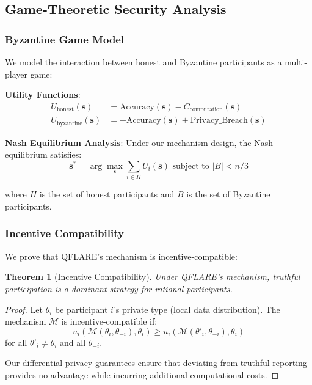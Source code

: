 \documentclass[journal]{IEEEtran}
\newtheorem{theorem}{Theorem}
\begin{document}
\subsection{Game-Theoretic Security Analysis}

\subsubsection{Byzantine Game Model}

We model the interaction between honest and Byzantine participants as a multi-player game:

\textbf{Utility Functions}:
\begin{align}
U_{\text{honest}}(\mathbf{s}) &= \text{Accuracy}(\mathbf{s}) - C_{\text{computation}}(\mathbf{s}) \\
U_{\text{byzantine}}(\mathbf{s}) &= -\text{Accuracy}(\mathbf{s}) + \text{Privacy\_Breach}(\mathbf{s})
\end{align}

\textbf{Nash Equilibrium Analysis}:
Under our mechanism design, the Nash equilibrium satisfies:
$$\mathbf{s}^* = \arg\max_{\mathbf{s}} \sum_{i \in H} U_i(\mathbf{s}) \text{ subject to } |B| < n/3$$

where $H$ is the set of honest participants and $B$ is the set of Byzantine participants.

\subsubsection{Incentive Compatibility}

We prove that QFLARE's mechanism is incentive-compatible:

\begin{theorem}[Incentive Compatibility]
Under QFLARE's mechanism, truthful participation is a dominant strategy for rational participants.
\end{theorem}

\begin{proof}
Let $\theta_i$ be participant $i$'s private type (local data distribution). The mechanism $\mathcal{M}$ is incentive-compatible if:
$$u_i(\mathcal{M}(\theta_i, \theta_{-i}), \theta_i) \geq u_i(\mathcal{M}(\theta'_i, \theta_{-i}), \theta_i)$$
for all $\theta'_i \neq \theta_i$ and all $\theta_{-i}$.

Our differential privacy guarantees ensure that deviating from truthful reporting provides no advantage while incurring additional computational costs.
\end{proof}
\end{document}
